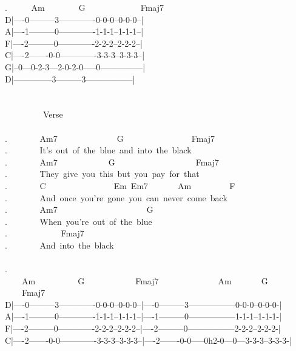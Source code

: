 {. \ \ \ \ \ Am\ \ \ \ \ \ \ \ G\ \ \ \ \ \ \ \ \ \ \ \ \ Fmaj7\ \ \ \ \ \ \ \ \ \ \\
D|----0---------3-------------0-0-0--0-0-0--|\\
A|----1---------0-------------1-1-1--1-1-1--|\\
F|----2---------0-------------2-2-2--2-2-2--|\\
C|----2-------0-0-------------3-3-3--3-3-3--|\\
G|--0---0-2-3---2-0-2-0-----0---------------|\\
D|--------------3---------3-----------------|\\
\\
\\
\ \ \ \ \ \ \ \ \lbrack\ Verse\rbrack\\
\\
. \ \ \ \ \ \ \ Am7\ \ \ \ \ \ \ \ \ \ \ \ \ \ G\ \ \ \ \ \ \ \ \ \ \ \ \ \ \ \ Fmaj7\\
. \ \ \ \ \ \ \ It's\ out\ of\ the\ blue\ and\ into\ the\ black\\
. \ \ \ \ \ \ \ Am7\ \ \ \ \ \ \ \ \ \ \ \ G\ \ \ \ \ \ \ \ \ \ \ \ \ \ \ \ \ \ \ Fmaj7\\
. \ \ \ \ \ \ \ They\ give\ you\ this\ but\ you\ pay\ for\ that\\
. \ \ \ \ \ \ \ C\ \ \ \ \ \ \ \ \ \ \ \ \ \ \ \ Em\ Em7\ \ \ \ \ \ \ Am\ \ \ \ \ \ \ \ \ F\\
. \ \ \ \ \ \ \ And\ once\ you're\ gone\ you\ can\ never\ come\ back\\
. \ \ \ \ \ \ \ Am7\ \ \ \ \ \ \ \ \ \ \ \ \ \ \ \ \ \ \ \ \ G\\
. \ \ \ \ \ \ \ When\ you're\ out\ of\ the\ blue\\
. \ \ \ \ \ \ \ \ \ \ \ \ Fmaj7\\
. \ \ \ \ \ \ \ And\ into\ the\ black\\
\\
. \ \ \ \ Am\ \ \ \ \ \ \ \ \ \ G\ \ \ \ \ \ \ \ \ \ \ \ Fmaj7\ \ \ \ \ \ \ \ \ \ \ \ \ \ Am\ \ \ \ \ \ \ G\ \ \ \ \ \ \ \ \ \ \ \ \ \ Fmaj7\\
D|----0---------3-------------0-0-0--0-0-0--|----0---------3-----------------0-0-0--0-0-0-|\\
A|----1---------0-------------1-1-1--1-1-1--|----1---------0-----------------1-1-1--1-1-1-|\\
F|----2---------0-------------2-2-2--2-2-2--|----2---------0-----------------2-2-2--2-2-2-|\\
C|----2-------0-0-------------3-3-3--3-3-3--|----2-------0-0-----0h2-0---0---3-3-3--3-3-3-|\\
}
